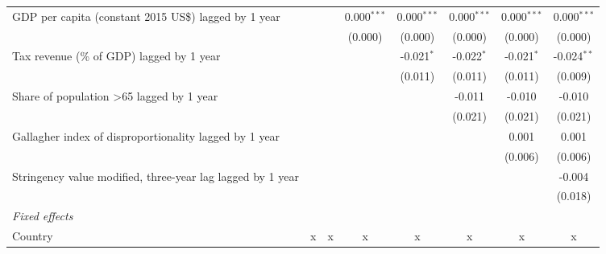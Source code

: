 \begin{tabular}{lccccccc}
   GDP per capita (constant 2015 US\$) lagged by 1 year                                      &             &             & 0.000$^{***}$ & 0.000$^{***}$ & 0.000$^{***}$ & 0.000$^{***}$ & 0.000$^{***}$\\   
                                                                                             &             &             & (0.000)       & (0.000)       & (0.000)       & (0.000)       & (0.000)\\   
   Tax revenue (\% of GDP) lagged by 1 year                                                  &             &             &               & -0.021$^{*}$  & -0.022$^{*}$  & -0.021$^{*}$  & -0.024$^{**}$\\   
                                                                                             &             &             &               & (0.011)       & (0.011)       & (0.011)       & (0.009)\\   
   Share of population >65 lagged by 1 year                                                  &             &             &               &               & -0.011        & -0.010        & -0.010\\   
                                                                                             &             &             &               &               & (0.021)       & (0.021)       & (0.021)\\   
   Gallagher index of disproportionality lagged by 1 year                                    &             &             &               &               &               & 0.001         & 0.001\\   
                                                                                             &             &             &               &               &               & (0.006)       & (0.006)\\   
   Stringency value modified, three-year lag lagged by 1 year                                &             &             &               &               &               &               & -0.004\\   
                                                                                             &             &             &               &               &               &               & (0.018)\\   
   \emph{Fixed effects}\\
   Country                                                                                   & x           & x           & x             & x             & x             & x             & x\\  

\end{tabular}

